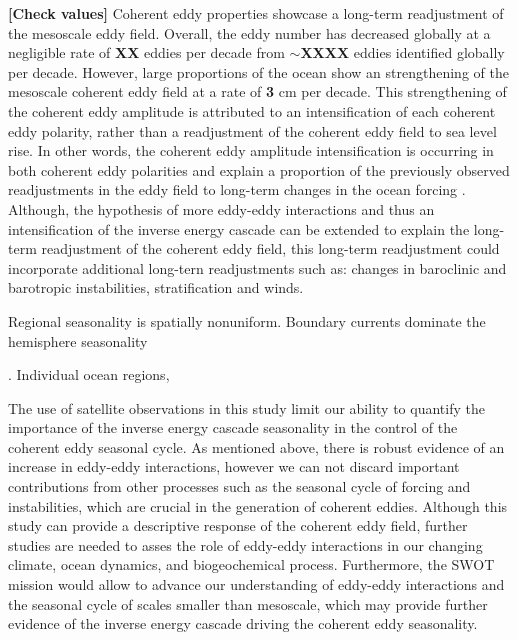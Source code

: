\documentclass[draft,linenumbers]{agujournal2019}
\begin{document}
	\textbf{[Check values]}
	Coherent eddy properties showcase a long-term readjustment of the mesoscale eddy field. 
	Overall, the eddy number has decreased globally at a negligible rate of \textbf{XX} eddies per decade from $\sim$\textbf{XXXX} eddies identified globally per decade. 
	However, large proportions of the ocean show an strengthening of the mesoscale coherent eddy field at a rate of \textbf{3} cm per decade. 
	This strengthening of the coherent eddy amplitude is attributed to an intensification of each coherent eddy polarity, rather than a readjustment of the coherent eddy field to sea level rise. 
	In other words, the coherent eddy amplitude intensification is occurring in both coherent eddy polarities and explain a proportion of the previously observed readjustments in the eddy field to long-term changes in the ocean forcing \citep{Hu_acceleration_2020,Wunsch_speeding_2020,Martinez_Kinetic_2021}. 
	Although, the hypothesis of more eddy-eddy interactions and thus an intensification of the inverse energy cascade can be extended to explain the long-term readjustment of the coherent eddy field, this long-term readjustment could incorporate additional long-tern readjustments such as: changes in baroclinic and barotropic instabilities, stratification and winds.
	
		



	Regional seasonality is spatially nonuniform. Boundary currents dominate the hemisphere seasonality
	
	. Individual ocean regions, 







	
	The use of satellite observations in this study limit our ability to quantify the importance of the inverse energy cascade seasonality in the control of the coherent eddy seasonal cycle. 
	As mentioned above, there is robust evidence of an increase in eddy-eddy interactions, however we can not discard important contributions from other processes such as the seasonal cycle of forcing and instabilities, which are crucial in the generation of coherent eddies. Although this study can provide a descriptive response of the coherent eddy field, further studies are needed to asses the role of eddy-eddy interactions in our changing climate, ocean dynamics, and biogeochemical process. Furthermore, the SWOT mission would allow to advance our understanding of eddy-eddy interactions and the seasonal cycle of scales smaller than mesoscale, which may provide further evidence of the inverse energy cascade driving the coherent eddy seasonality.
\end{document}
